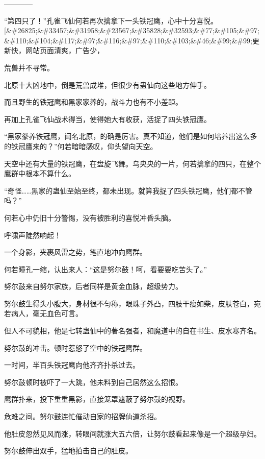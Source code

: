 
\begin{this_body}

------------

“第四只了！”孔雀飞仙何若再次擒拿下一头铁冠鹰，心中十分喜悦。[\&\#26825;\&\#33457;\&\#31958;\&\#23567;\&\#35828;\&\#32593;\&\#77;\&\#105;\&\#97;\&\#110;\&\#104;\&\#117;\&\#97;\&\#116;\&\#97;\&\#110;\&\#103;\&\#46;\&\#99;\&\#99;更新快，网站页面清爽，广告少，

荒兽并不寻常。

北原十大凶地中，倒是荒兽成堆，但很少有蛊仙向这些地方伸手。

而且野生的铁冠鹰和黑家家养的，战斗力也有不小差距。

再加上孔雀飞仙战术得当，使得她大有收获，活捉了四头铁冠鹰。

“黑家豢养铁冠鹰，闻名北原，的确是厉害。真不知道，他们是如何培养出这么多的铁冠鹰来的？”何若暗暗感叹，仰头望向天空。

天空中还有大量的铁冠鹰，在盘旋飞舞。乌央央的一片，何若擒拿的四只，在整个鹰群中根本不算什么。

“奇怪……黑家的蛊仙至始至终，都未出现。就算我捉了四头铁冠鹰，他们都不管吗？”

何若心中仍旧十分警惕，没有被胜利的喜悦冲昏头脑。

呼啸声陡然响起！

一个身影，夹裹风雷之势，笔直地冲向鹰群。

何若瞳孔一缩，认出来人：“这是努尔鼓！呵，看要要吃苦头了。”

努尔鼓来自努尔家族，后者同样是黄金血脉，超级势力。

努尔鼓生得头小腹大，身材很不匀称，眼珠子外凸，四肢干瘦如柴，皮肤苍白，宛若病人，毫无血色可言。

但人不可貌相，他是七转蛊仙中的著名强者，和魔道中的自在书生、皮水寒齐名。

努尔鼓的冲击。顿时惹怒了空中的铁冠鹰群。

一时间，半百头铁冠鹰向他齐齐扑杀过去。

努尔鼓顿时被吓了一大跳，他未料到自己居然这么招恨。

鹰群扑来，投下重重黑影，直接笼罩遮蔽了努尔鼓的视野。

危难之间。努尔鼓连忙催动自家的招牌仙道杀招。

他肚皮忽然见风而涨，转眼间就涨大五六倍，让努尔鼓看起来像是一个超级孕妇。

努尔鼓伸出双手，猛地拍击自己的肚皮。


\end{this_body}
